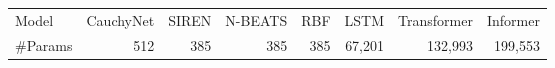 \begin{tabular}{lrrrrrrr}
Model & CauchyNet & SIREN & N-BEATS & RBF & LSTM & Transformer & Informer \\
\#Params & 512 & 385 & 385 & 385 & 67,201 & 132,993 & 199,553 \\
\end{tabular}

